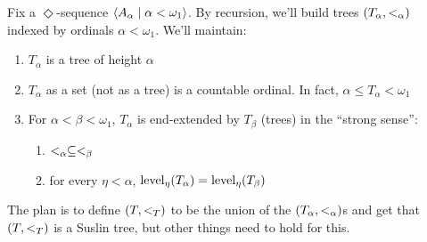 \begin{boxconstruction}
    Fix a $\Diamond$-sequence $\left\langle A_{\alpha} \; \middle| \; \alpha < \omega_1 \right\rangle$. By recursion, we'll build trees $\left( T_{\alpha}, <_{\alpha} \right)$ indexed by ordinals $\alpha < \omega_1$. We'll maintain:
    \begin{enumerate}
        \item $T_{\alpha}$ is a tree of height $\alpha$
        \item $T_{\alpha}$ as a set (not as a tree) is a countable ordinal. In fact, $\alpha \leq T_{\alpha} < \omega_1$
        \item For $\alpha < \beta < \omega_1$, $T_{\alpha}$ is end-extended by $T_{\beta}$ (trees) in the ``strong sense'':
        \begin{enumerate}
            \item $<_{\alpha} \subseteq <_{\beta}$
            \item for every $\eta < \alpha$, $\operatorname{level}_{\eta}\!\left( T_{\alpha} \right) = \operatorname{level}_{\eta}\!\left( T_{\beta} \right)$
        \end{enumerate}
    \end{enumerate}
    The plan is to define $\left( T, <_T \right)$ to be the union of the $\left( T_{\alpha}, <_{\alpha} \right)$s and get that $\left( T, <_T \right)$ is a Suslin tree, but other things need to hold for this. \\


\end{boxconstruction}
